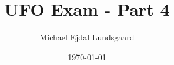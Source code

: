 \documentclass{article}
\title{UFO Exam - Part 4}
\author{Michael Ejdal Lundsgaard}
\date{\today}
\begin{document}
\maketitle
\pagebreak





\printbibliography
\end{document}
